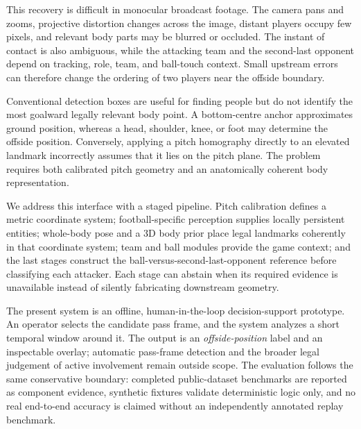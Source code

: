 \documentclass[runningheads]{llncs}
\begin{document}
This recovery is difficult in monocular broadcast footage. The camera pans and zooms, projective distortion changes across the image, distant players occupy few pixels, and relevant body parts may be blurred or occluded. The instant of contact is also ambiguous, while the attacking team and the second-last opponent depend on tracking, role, team, and ball-touch context. Small upstream errors can therefore change the ordering of two players near the offside boundary.

Conventional detection boxes are useful for finding people but do not identify the most goalward legally relevant body point. A bottom-centre anchor approximates ground position, whereas a head, shoulder, knee, or foot may determine the offside position. Conversely, applying a pitch homography directly to an elevated landmark incorrectly assumes that it lies on the pitch plane. The problem requires both calibrated pitch geometry and an anatomically coherent body representation.

We address this interface with a staged pipeline. Pitch calibration defines a metric coordinate system; football-specific perception supplies locally persistent entities; whole-body pose and a 3D body prior place legal landmarks coherently in that coordinate system; team and ball modules provide the game context; and the last stages construct the ball-versus-second-last-opponent reference before classifying each attacker. Each stage can abstain when its required evidence is unavailable instead of silently fabricating downstream geometry.

The present system is an offline, human-in-the-loop decision-support prototype. An operator selects the candidate pass frame, and the system analyzes a short temporal window around it. The output is an \emph{offside-position} label and an inspectable overlay; automatic pass-frame detection and the broader legal judgement of active involvement remain outside scope. The evaluation follows the same conservative boundary: completed public-dataset benchmarks are reported as component evidence, synthetic fixtures validate deterministic logic only, and no real end-to-end accuracy is claimed without an independently annotated replay benchmark.
\end{document}
